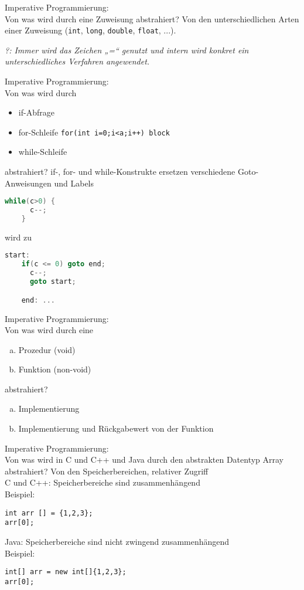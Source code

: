 \begin{card}
	Imperative Programmierung:\\
	Von was wird durch eine Zuweisung abstrahiert?
	\hr
  Von den unterschiedlichen Arten einer Zuweisung (\texttt{int}, \texttt{long}, \texttt{double}, \texttt{float}, ...).

  \textit{?: Immer wird das Zeichen „=“ genutzt und intern wird konkret ein unterschiedliches Verfahren angewendet.}
\end{card}

\begin{card}
	Imperative Programmierung:\\
	Von was wird durch
	\begin{itemize}
	\item if-Abfrage
	\item for-Schleife \texttt{for(int i=0;i<a;i++) block}
	\item while-Schleife
	\end{itemize}
	abstrahiert?
	\hr
	if-, for- und while-Konstrukte ersetzen verschiedene Goto-Anweisungen und Labels
	\begin{lstlisting}[language=C]
	while(c>0) {
	  c--;
	}
	\end{lstlisting}
	wird zu
	\begin{lstlisting}[language=C]
	start:
	if(c <= 0) goto end;
	  c--;
	  goto start;

	end: ...
	\end{lstlisting}
\end{card}

\begin{card}
	Imperative Programmierung:\\
	Von was wird durch eine
	\begin{enumerate}[a)]
	\item Prozedur (void)
	\item Funktion (non-void)
	\end{enumerate}
	abstrahiert?
	\hr
	\begin{enumerate}[a)]
	\item Implementierung
	\item Implementierung und Rückgabewert von der Funktion
	\end{enumerate}
\end{card}

\begin{card}
	Imperative Programmierung:\\
	Von was wird in C und C++ und Java durch den abstrakten Datentyp Array abstrahiert?
	\hr
	Von den Speicherbereichen, relativer Zugriff\\
	C und C++: Speicherbereiche sind zusammenhängend\\
	Beispiel:
	\begin{lstlisting}
int arr [] = {1,2,3};
arr[0];
	\end{lstlisting}

	Java: Speicherbereiche sind nicht zwingend zusammenhängend\\
	Beispiel:
	\begin{lstlisting}
int[] arr = new int[]{1,2,3};
arr[0];
	\end{lstlisting}

\end{card}


